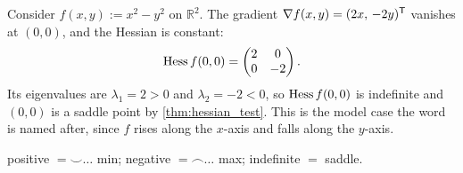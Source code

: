 \begin{aiexample}
\label{ex:ai_saddle_via_hessian}
Consider $f(x,y) := x^2-y^2$ on $\mathbb{R}^2$. The gradient
$\nabla f(x,y) = (2x,\,-2y)^{\mathsf{T}}$ vanishes at $(0,0)$, and the Hessian is constant:
\[
\operatorname{Hess} f(0,0) = \begin{pmatrix} 2 & 0 \\ 0 & -2 \end{pmatrix}.
\]
Its eigenvalues are $\lambda_1 = 2 > 0$ and $\lambda_2 = -2 < 0$, so $\operatorname{Hess} f(0,0)$ is
indefinite and $(0,0)$ is a saddle point by \cref{thm:hessian_test}. This is the model case the
word  is named after, since $f$ rises along the $x$-axis and falls along the $y$-axis.
\end{aiexample}

\begin{remark}[Mnemonic]
positive $= \smile \dots$ min; negative $= \frown \dots$ max; indefinite $=$ saddle.
\end{remark}

